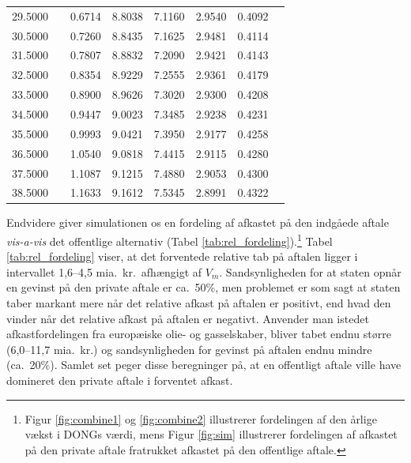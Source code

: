 \documentclass{article}
\begin{document}
\begin{table}[h]
\begin{tabularx}{0.95\linewidth}{cXcccccr}
 29.5000&&0.6714&8.8038&7.1160&2.9540&0.4092\\
 30.5000&&0.7260&8.8435&7.1625&2.9481&0.4114\\
 31.5000&&0.7807&8.8832&7.2090&2.9421&0.4143\\
 32.5000&&0.8354&8.9229&7.2555&2.9361&0.4179\\
 33.5000&&0.8900&8.9626&7.3020&2.9300&0.4208\\
 34.5000&&0.9447&9.0023&7.3485&2.9238&0.4231\\
 35.5000&&0.9993&9.0421&7.3950&2.9177&0.4258\\
 36.5000&&1.0540&9.0818&7.4415&2.9115&0.4280\\
 37.5000&&1.1087&9.1215&7.4880&2.9053&0.4300\\
 38.5000&&1.1633&9.1612&7.5345&2.8991&0.4322\\

\bottomrule[1pt]
	\end{tabularx}
	\begin{minipage}{\linewidth}
	\end{minipage}
\end{table}


Endvidere giver simulationen os en fordeling af afkastet på den indgåede aftale \emph{vis-a-vis} det offentlige alternativ (Tabel \ref{tab:rel_fordeling}).\footnote{Figur \ref{fig:combine1} og \ref{fig:combine2} illustrerer fordelingen af den årlige vækst i DONGs værdi, mens Figur \ref{fig:sim} illustrerer fordelingen af afkastet på den private aftale fratrukket afkastet på den offentlige aftale.} Tabel \ref{tab:rel_fordeling} viser, at det forventede relative tab på aftalen ligger i intervallet 1,6--4,5 mia.\ kr.\ afhængigt af $V_m$. Sandsynligheden for at staten opnår en gevinst på den private aftale er ca.\ 50\%, men problemet er som sagt at staten taber markant mere når det relative afkast på aftalen er positivt, end hvad den vinder når det relative afkast på aftalen er negativt. Anvender man istedet afkastfordelingen fra europæiske olie- og gasselskaber, bliver tabet endnu større (6,0--11,7 mia.\ kr.) og sandsynligheden for gevinst på aftalen endnu mindre (ca.\ 20\%). Samlet set peger disse beregninger på, at en offentligt aftale ville have domineret den private aftale i forventet afkast.
\end{document}
